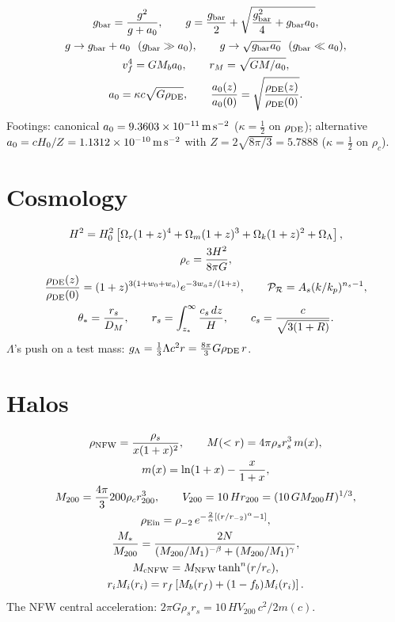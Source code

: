 \begin{gather*}
g_{\rm bar}=\frac{g^2}{g+a_0},\qquad g=\frac{g_{\rm bar}}2+\sqrt{\frac{g_{\rm bar}^2}4+g_{\rm bar} a_0},\\
g\to g_{\rm bar}+a_0\ \ (g_{\rm bar}\gg a_0),\qquad g\to\sqrt{g_{\rm bar} a_0}\ \ (g_{\rm bar}\ll a_0),\\
v_f^4=GM_ba_0,\qquad r_M=\sqrt{GM/a_0},\\
a_0=\kappa c\sqrt{G\rho_{\rm DE}},\qquad\frac{a_0(z)}{a_0(0)}=\sqrt{\frac{\rho_{\rm DE}(z)}{\rho_{\rm DE}(0)}}.
\end{gather*}
Footings: canonical $a_0=9.3603\times10^{-11}\,\mathrm{m\,s^{-2}}$ ($\kappa=\tfrac12$ on $\rho_{\rm DE}$); alternative $a_0=cH_0/Z=1.1312\times10^{-10}\,\mathrm{m\,s^{-2}}$ with $Z=2\sqrt{8\pi/3}=5.7888$ ($\kappa=\tfrac12$ on $\rho_c$).

\section{Cosmology}

\begin{gather*}
H^2=H_0^2\left[\Omega_r(1+z)^4+\Omega_m(1+z)^3+\Omega_k(1+z)^2+\Omega_\Lambda\right],\\ \rho_c=\frac{3H^2}{8\pi G},\\
\frac{\rho_{\rm DE}(z)}{\rho_{\rm DE}(0)}=(1+z)^{3(1+w_0+w_a)}e^{-3w_az/(1+z)},\qquad\mathcal P_{\mathcal R}=A_s(k/k_p)^{n_s-1},\\
\theta_*=\frac{r_s}{D_M},\qquad r_s=\int_{z_*}^\infty\frac{c_s\,dz}{H},\qquad c_s=\frac{c}{\sqrt{3(1+R)}}.
\end{gather*}
$\Lambda$'s push on a test mass: $g_\Lambda=\tfrac13\Lambda c^2r=\tfrac{8\pi}{3}G\rho_{\rm DE}\,r$.

\section{Halos}

\begin{gather*}
\rho_{\rm NFW}=\frac{\rho_s}{x(1+x)^2},\qquad M(<r)=4\pi\rho_sr_s^3\,m(x),\\ m(x)=\ln(1+x)-\frac{x}{1+x},\\
M_{200}=\frac{4\pi}{3}200\rho_cr_{200}^3,\qquad V_{200}=10\,Hr_{200}=(10\,GM_{200}H)^{1/3},\\
\rho_{\rm Ein}=\rho_{-2}\,e^{-\frac2\alpha[(r/r_{-2})^\alpha-1]},\\ \frac{M_*}{M_{200}}=\frac{2N}{(M_{200}/M_1)^{-\beta}+(M_{200}/M_1)^{\gamma}},\\
M_{\rm cNFW}=M_{\rm NFW}\tanh^n(r/r_c),\\ r_iM_i(r_i)=r_f\left[M_b(r_f)+(1-f_b)M_i(r_i)\right].
\end{gather*}
The NFW central acceleration: $2\pi G\rho_sr_s=10\,HV_{200}\,c^2/2m(c)$.

